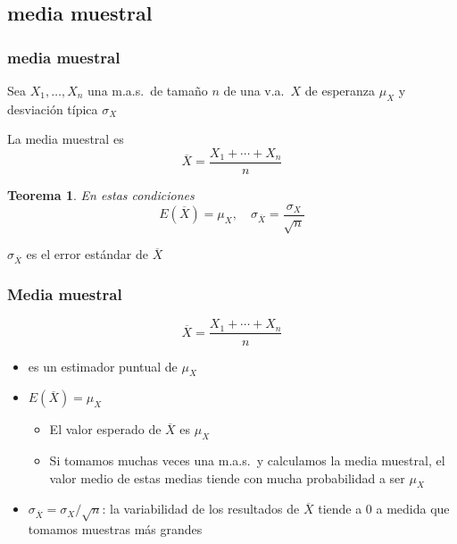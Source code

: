 \documentclass[12pt,t]{beamer}
\renewcommand{\emph}[1]{{\color{red}#1}}
\theoremstyle{plain}
\newtheorem{teorema}{Teorema}
\theoremstyle{definition}
\begin{document}
%



\subsection{media muestral}
\begin{frame}
\frametitle{media muestral}

Sea $X_1,\ldots, X_n$ una m.a.s.\ de tamaño $n$ de una v.a.\ $X$ de esperanza $\mu_X$ y desviación típica $\sigma_X$
\medskip

La \emph{media muestral} es
$$
\overline{X}=\frac{X_1+\cdots+X_n}{n}
$$

\begin{teorema}
En estas condiciones
$$
E(\overline{X})=\mu_X,\quad \sigma_{\overline{X}}=\frac{\sigma_X}{\sqrt{n}}
$$
\end{teorema}

 $\sigma_{\overline{X}}$ es el \emph{error estándar} de $\overline{X}$



\end{frame}

\begin{frame}
\frametitle{Media muestral}

$$
\overline{X}=\frac{X_1+\cdots+X_n}{n}
$$
\begin{itemize}
\item es un estimador puntual de $\mu_X$
\medskip

\item \emph{$E(\overline{X})=\mu_X$}
\begin{itemize}
\item El valor esperado de $\overline{X}$ es $\mu_X$
\medskip

\item Si tomamos muchas veces una m.a.s.\ y calculamos la media muestral, el valor medio  de estas medias tiende con mucha probabilidad a ser $\mu_X$
\end{itemize}
\bigskip

\item \emph{$\sigma_{\overline{X}}= \sigma_X/\sqrt{n}$}: la variabilidad de los resultados de $\overline{X}$ tiende a 0  a medida que tomamos muestras más grandes 
\end{itemize}

\end{frame}
\end{document}
